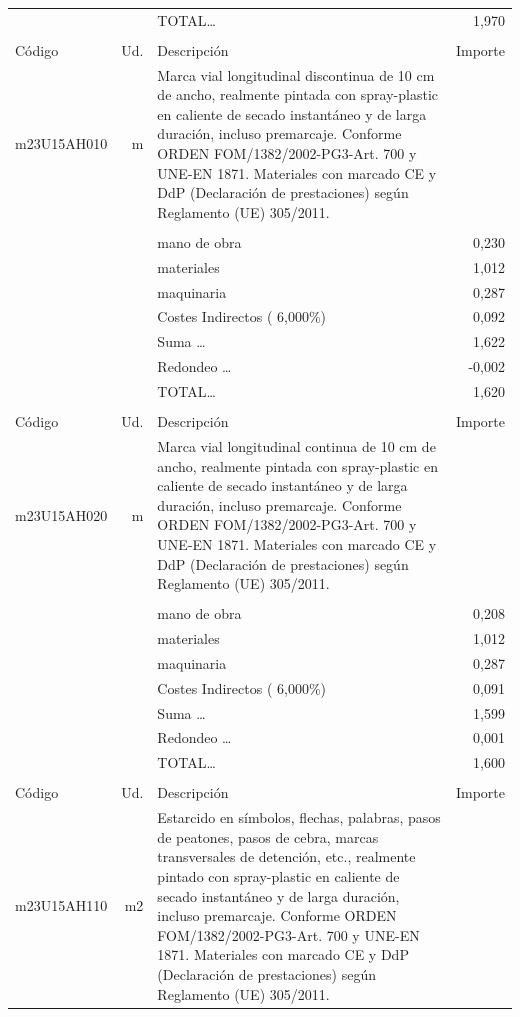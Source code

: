 \documentclass{book}%
\begin{document}
\begin{supertabular}{l r p{60mm} r}
&&TOTAL\ldots&     1,970\\%
&&&\\%
Código&Ud.&Descripción&Importe\\%
\hline%
m23U15AH010&m&Marca vial longitudinal discontinua de 10 cm de ancho, realmente pintada con spray{-}plastic en caliente de secado instantáneo y de larga duración, incluso premarcaje. Conforme ORDEN FOM/1382/2002{-}PG3{-}Art. 700 y UNE{-}EN 1871. Materiales con marcado CE y DdP (Declaración de prestaciones) según Reglamento (UE) 305/2011.&\\%
&&&\\%
&&mano de obra&     0,230\\%
&&materiales&     1,012\\%
&&maquinaria&     0,287\\%
&&Costes Indirectos (     6,000\%)&     0,092\\%
&&Suma \ldots&     1,622\\%
&&Redondeo \ldots&    {-}0,002\\%
%
&&TOTAL\ldots&     1,620\\%
&&&\\%
Código&Ud.&Descripción&Importe\\%
\hline%
m23U15AH020&m&Marca vial longitudinal continua de 10 cm de ancho, realmente pintada con spray{-}plastic en caliente de secado instantáneo y de larga duración, incluso premarcaje. Conforme ORDEN FOM/1382/2002{-}PG3{-}Art. 700 y UNE{-}EN 1871. Materiales con marcado CE y DdP (Declaración de prestaciones) según Reglamento (UE) 305/2011.&\\%
&&&\\%
&&mano de obra&     0,208\\%
&&materiales&     1,012\\%
&&maquinaria&     0,287\\%
&&Costes Indirectos (     6,000\%)&     0,091\\%
&&Suma \ldots&     1,599\\%
&&Redondeo \ldots&     0,001\\%
%
&&TOTAL\ldots&     1,600\\%
&&&\\%
Código&Ud.&Descripción&Importe\\%
\hline%
m23U15AH110&m2&Estarcido en símbolos, flechas, palabras, pasos de peatones, pasos de cebra, marcas transversales de detención, etc., realmente pintado con spray{-}plastic en caliente de secado instantáneo y de larga duración, incluso premarcaje. Conforme ORDEN FOM/1382/2002{-}PG3{-}Art. 700 y UNE{-}EN 1871. Materiales con marcado CE y DdP (Declaración de prestaciones) según Reglamento (UE) 305/2011.&\\%

\end{supertabular}
\end{document}
